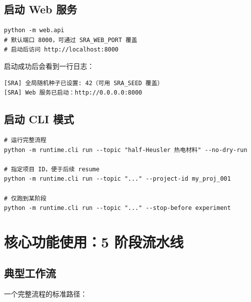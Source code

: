 \documentclass[11pt,a4paper]{article}
\begin{document}
\subsection{启动 Web 服务}

\begin{verbatim}
python -m web.api
# 默认端口 8000，可通过 SRA_WEB_PORT 覆盖
# 启动后访问 http://localhost:8000
\end{verbatim}

启动成功后会看到一行日志：
\begin{verbatim}
[SRA] 全局随机种子已设置: 42（可用 SRA_SEED 覆盖）
[SRA] Web 服务已启动：http://0.0.0.0:8000
\end{verbatim}

\subsection{启动 CLI 模式}

\begin{verbatim}
# 运行完整流程
python -m runtime.cli run --topic "half-Heusler 热电材料" --no-dry-run

# 指定项目 ID，便于后续 resume
python -m runtime.cli run --topic "..." --project-id my_proj_001

# 仅跑到某阶段
python -m runtime.cli run --topic "..." --stop-before experiment
\end{verbatim}

\section{核心功能使用：5 阶段流水线}

\subsection{典型工作流}

一个完整流程的标准路径：
\end{document}
